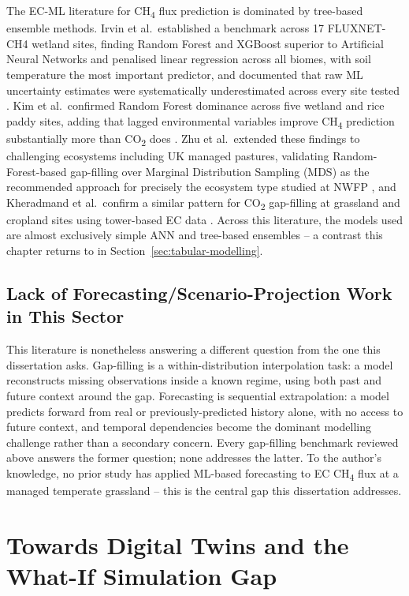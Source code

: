 The EC-ML literature for CH\textsubscript{4} flux prediction is dominated by tree-based ensemble
methods. Irvin et al.\ established a benchmark across 17 FLUXNET-CH4 wetland sites, finding Random
Forest and XGBoost superior to Artificial Neural Networks and penalised linear regression across
all biomes, with soil temperature the most important predictor, and documented that raw ML
uncertainty estimates were systematically underestimated across every site tested
\cite{irvin2021}. Kim et al.\ confirmed Random Forest dominance across five wetland and rice paddy
sites, adding that lagged environmental variables improve CH\textsubscript{4} prediction
substantially more than CO\textsubscript{2} does \cite{kim2020}. Zhu et al.\ extended these
findings to challenging ecosystems including UK managed pastures, validating Random-Forest-based
gap-filling over Marginal Distribution Sampling (MDS) as the recommended approach for precisely
the ecosystem type studied at NWFP \cite{zhu2023a}, and Kheradmand et al.\ confirm a similar
pattern for CO\textsubscript{2} gap-filling at grassland and cropland sites using tower-based EC
data \cite{kheradmand2023}. Across this literature, the models used are almost exclusively simple
ANN and tree-based ensembles -- a contrast this chapter returns to in
Section~\ref{sec:tabular-modelling}.

\subsection{Lack of Forecasting/Scenario-Projection Work in This Sector}

This literature is nonetheless answering a different question from the one this dissertation
asks. Gap-filling is a within-distribution interpolation task: a model reconstructs missing
observations inside a known regime, using both past and future context around the gap. Forecasting
is sequential extrapolation: a model predicts forward from real or previously-predicted history
alone, with no access to future context, and temporal dependencies become the dominant modelling
challenge rather than a secondary concern. Every gap-filling benchmark reviewed above answers the
former question; none addresses the latter. To the author's knowledge, no prior study has applied
ML-based forecasting to EC CH\textsubscript{4} flux at a managed temperate grassland -- this is the
central gap this dissertation addresses.

\section{Towards Digital Twins and the What-If Simulation Gap}

